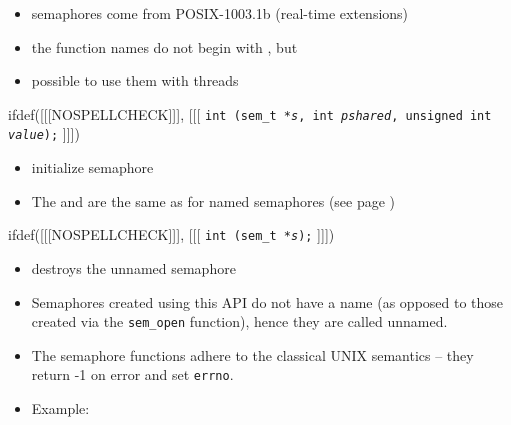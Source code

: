 \begin{slide}
\begin{itemize}
\item semaphores come from POSIX-1003.1b (real-time extensions)
\item the function names do not begin with ,
but 
\item possible to use them with threads
\end{itemize}
ifdef([[[NOSPELLCHECK]]], [[[
\texttt{int (sem\_t *\emph{s},
int \emph{pshared}, unsigned int \emph{value});}
]]])
\begin{itemize}
\item initialize semaphore
\item The  and  are the same as for named
semaphores (see page \pageref{NAMED_SEMAPHORES})
\end{itemize}
ifdef([[[NOSPELLCHECK]]], [[[
\texttt{int (sem\_t *\emph{s});}
]]])
\begin{itemize}
\item destroys the unnamed semaphore
\end{itemize}
\end{slide}

\begin{itemize}
\item Semaphores created using this API do not have a name (as opposed to
those created via the \texttt{sem\_open} function), hence they are called
unnamed.
\item The semaphore functions adhere to the classical UNIX semantics --
they return -1 on error and set \texttt{errno}.
\item Example: 
\end{itemize}


